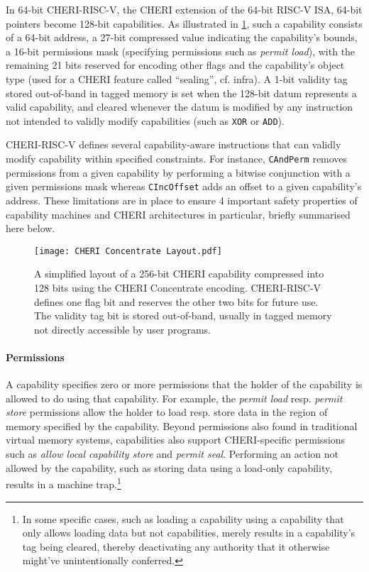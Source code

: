 \documentclass[main.tex]{subfiles}
\begin{document}
In 64-bit CHERI-RISC-V, the CHERI extension of the 64-bit RISC-V ISA, 64-bit pointers become 128-bit capabilities. As illustrated in \cref{fig:chericoncentrate}, such a capability consists of a 64-bit address, a 27-bit compressed value indicating the capability’s bounds, a 16-bit permissions mask (specifying permissions such as \emph{permit load}), with the remaining 21 bits reserved for encoding other flags and the capability’s object type (used for a CHERI feature called “sealing”, cf. infra). A 1-bit validity tag stored out-of-band in tagged memory is set when the 128-bit datum represents a valid capability, and cleared whenever the datum is modified by any instruction not intended to validly modify capabilities (such as \texttt{XOR} or \texttt{ADD}).

CHERI-RISC-V defines several capability-aware instructions that can validly modify capability within specified constraints. For instance, \texttt{CAndPerm} removes permissions from a given capability by performing a bitwise conjunction with a given permissions mask whereas \texttt{CIncOffset} adds an offset to a given capability's address. These limitations are in place to ensure 4 important safety properties of capability machines and CHERI architectures in particular, briefly summarised here below.

\begin{figure}
	\begin{center}
		\texttt{[image: CHERI Concentrate Layout.pdf]}
	\end{center}
	\caption{A simplified layout of a 256-bit CHERI capability compressed into 128 bits using the CHERI Concentrate encoding. CHERI-RISC-V defines one flag bit and reserves the other two bits for future use. The validity tag bit is stored out-of-band, usually in tagged memory not directly accessible by user programs.}
	\label{fig:chericoncentrate}
\end{figure}

\paragraph{Permissions} A capability specifies zero or more permissions that the holder of the capability is allowed to do using that capability. For example, the \emph{permit load} resp. \emph{permit store} permissions allow the holder to load resp. store data in the region of memory specified by the capability. Beyond permissions also found in traditional virtual memory systems, capabilities also support CHERI-specific permissions such as \emph{allow local capability store} and \emph{permit seal}. Performing an action not allowed by the capability, such as storing data using a load-only capability, results in a machine trap.\footnote{In some specific cases, such as loading a capability using a capability that only allows loading data but not capabilities, merely results in a capability's tag being cleared, thereby deactivating any authority that it otherwise might've unintentionally conferred.}
\end{document}
